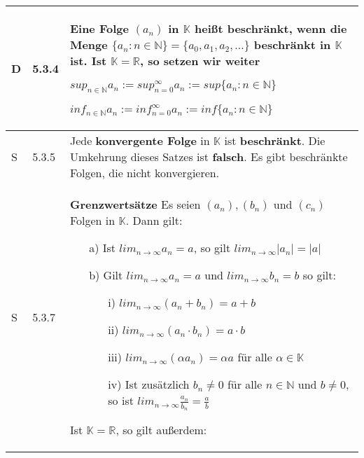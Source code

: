 \begin{longtable}{p{0.75cm} p{1cm} p{16cm}}
        \midrule
        D   & 5.3.4 &   Eine Folge $(a_n)$ in $\mathbb{K}$ heißt \textbf{beschränkt}, wenn die Menge $\{a_n: n \in \mathbb{N}\} = \{a_0,a_1,a_2,...\}$
                        beschränkt in $\mathbb{K}$ ist. \hfill \break
                        Ist $\mathbb{K} = \mathbb{R}$, so setzen wir weiter \hfill \break
                        \centerline{$sup_{n \in \mathbb{N}}a_n := sup^{\infty}_{n=0}a_n := sup\{a_n: n \in \mathbb{N}\}$} 
                        \centerline{$inf_{n \in \mathbb{N}}a_n := inf^{\infty}_{n=0}a_n := inf\{a_n: n \in \mathbb{N}\}$} \\
        \midrule
        S   & 5.3.5 &   Jede \textbf{konvergente Folge} in $\mathbb{K}$ ist \textbf{beschränkt}. \hfill \break
                        Die Umkehrung dieses Satzes ist \textbf{falsch}. Es gibt beschränkte Folgen, die nicht konvergieren. \\
        \midrule
        S   & 5.3.7 &   \textbf{Grenzwertsätze} \hfill \break
                        Es seien $(a_n), (b_n)$ und $(c_n)$ Folgen in $\mathbb{K}$. Dann gilt:
                        \begin{itemize}
                            \item[a)] Ist $lim_{n\rightarrow \infty} a_n = a$, so gilt $lim_{n \rightarrow \infty} |a_n| = |a|$
                            \item[b)] Gilt $lim_{n \rightarrow \infty} a_n = a$ und $lim_{n \rightarrow \infty} b_n = b$ so gilt:
                                \begin{itemize}[topsep=-0.5cm]
                                    \item[i)] $lim_{n \rightarrow \infty}(a_n + b_n) = a + b$
                                    \item[ii)] $lim_{n \rightarrow \infty} (a_n \cdot b_n) = a \cdot b$
                                    \item[iii)] $lim_{n \rightarrow \infty} (\alpha a_n) = \alpha a$ für alle $\alpha \in \mathbb{K}$
                                    \item[iv)] Ist zusätzlich $b_n \neq 0$ für alle $n \in \mathbb{N}$ und $b \neq 0$, 
                                                so ist $lim_{n \rightarrow \infty} \frac{a_n}{b_n} = \frac{a}{b}$
                                \end{itemize}
                        \end{itemize} \vspace{-0cm}
                        Ist $\mathbb{K} = \mathbb{R}$, so gilt außerdem:

\end{longtable}
